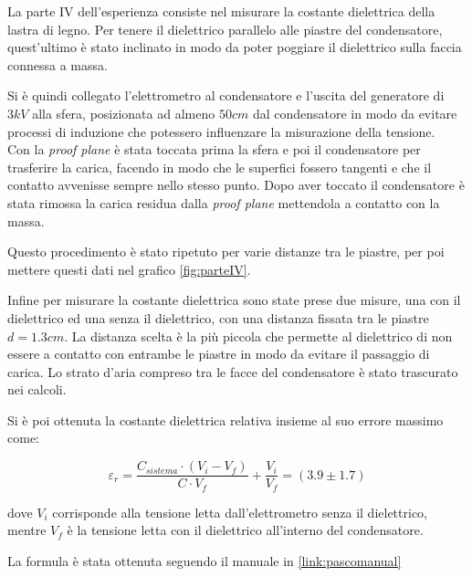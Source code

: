 {\fontsize{12}{14}\selectfont 

La parte IV dell'esperienza consiste nel misurare la costante dielettrica della lastra di legno. Per tenere il dielettrico parallelo alle piastre del condensatore, quest'ultimo è stato inclinato in modo da poter poggiare il dielettrico sulla faccia connessa a massa.

\par
Si è quindi collegato l'elettrometro al condensatore e l'uscita del generatore di $3kV$ alla sfera, posizionata ad almeno $50cm$ dal condensatore in modo da evitare processi di induzione che potessero influenzare la misurazione della tensione.
\\
Con la \emph{proof plane} è stata toccata prima la sfera e poi il condensatore per trasferire la carica, facendo in modo che le superfici fossero tangenti e che il contatto avvenisse sempre nello stesso punto. Dopo aver toccato il condensatore è stata rimossa la carica residua dalla \emph{proof plane} mettendola a contatto con la massa.
\par
Questo procedimento è stato ripetuto per varie distanze tra le piastre, per poi mettere questi dati nel grafico \ref{fig:parteIV}.

\par
Infine per misurare la costante dielettrica sono state prese due misure, una con il dielettrico ed una senza il dielettrico, con una distanza fissata tra le piastre $d = 1.3cm$. La distanza scelta è la più piccola che permette al dielettrico di non essere a contatto con entrambe le piastre in modo da evitare il passaggio di carica. Lo strato d'aria compreso tra le facce del condensatore è stato trascurato nei calcoli.

\par
Si è poi ottenuta la costante dielettrica relativa insieme al suo errore massimo come:

\begin{equation*}
    \varepsilon_r = \dfrac{C_{sistema} \cdot (V_i-V_f)}{C \cdot V_f} + \dfrac{V_i}{V_f} = (3.9 \pm 1.7)
\end{equation*}

dove $V_i$ corrisponde alla tensione letta dall'elettrometro senza il dielettrico, mentre $V_f$ è la tensione letta con il dielettrico all'interno del condensatore.
\par
La formula è stata ottenuta seguendo il manuale in \autoref{link:pascomanual}
\par}